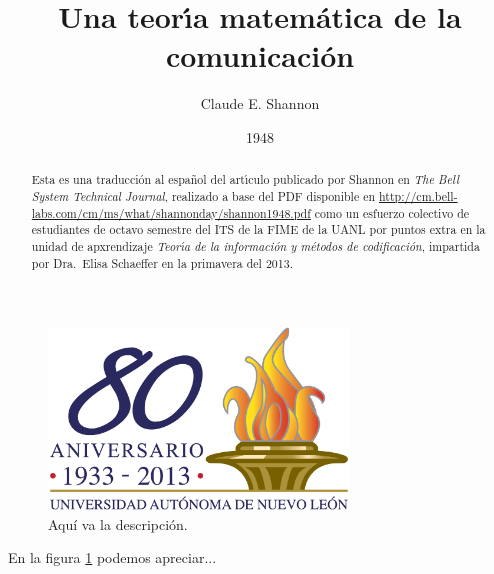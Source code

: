 \documentclass{report}
\author{Claude E. Shannon}
\title{Una teor\'{\i}a matem\'{a}tica de la comunicaci\'{o}n}
\date{1948}
\begin{document}
\maketitle

\newtheorem{theorem}{Teorema}[section]
\newtheorem{definition}{Definici\'{o}n}[section]

\begin{abstract}
  Esta es una traducci\'{o}n al espa\~{n}ol del art\'{\i}culo
  publicado por Shannon en {\em The Bell System Technical Journal},
  realizado a base del PDF disponible en
  \url{http://cm.bell-labs.com/cm/ms/what/shannonday/shannon1948.pdf}
  como un esfuerzo colectivo de estudiantes de octavo semestre del ITS
  de la FIME de la UANL por puntos extra en la unidad de apxrendizaje
  {\em Teor\'{\i}a de la informaci\'{o}n y m\'{e}todos de
    codificaci\'{o}n}, impartida por Dra.\ Elisa Schaeffer en la
  primavera del 2013.
\end{abstract}

\clearpage

\tableofcontents

\clearpage

\listoffigures

\clearpage

\listoftables

\clearpage

\begin{figure}
\centerline{\includegraphics[width=80mm]{ejemplo.png}}
\caption{Aqu\'{i} va la descripci\'{o}n.}
\label{figura_ejemplo}
\end{figure}

En la figura \ref{figura_ejemplo} podemos apreciar...

\end{document}

